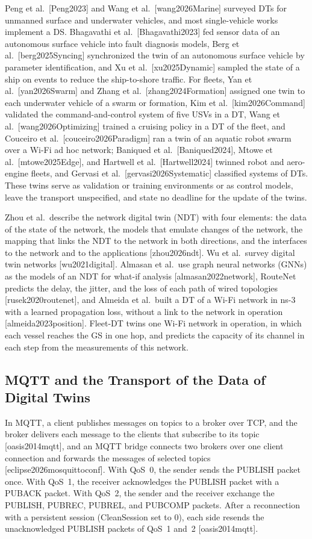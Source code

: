 Peng et al.\ [Peng2023] and Wang et al.\ [wang2026Marine] surveyed DTs for unmanned surface and underwater vehicles, and most single-vehicle works implement a DS. Bhagavathi et al.\ [Bhagavathi2023] fed sensor data of an autonomous surface vehicle into fault diagnosis models, Berg et al.\ [berg2025Syncing] synchronized the twin of an autonomous surface vehicle by parameter identification, and Xu et al.\ [xu2025Dynamic] sampled the state of a ship on events to reduce the ship-to-shore traffic. For fleets, Yan et al.\ [yan2026Swarm] and Zhang et al.\ [zhang2024Formation] assigned one twin to each underwater vehicle of a swarm or formation, Kim et al.\ [kim2026Command] validated the command-and-control system of five USVs in a DT, Wang et al.\ [wang2026Optimizing] trained a cruising policy in a DT of the fleet, and Couceiro et al.\ [couceiro2026Paradigm] ran a twin of an aquatic robot swarm over a Wi-Fi ad hoc network; Baniqued et al.\ [Baniqued2024], Mtowe et al.\ [mtowe2025Edge], and Hartwell et al.\ [Hartwell2024] twinned robot and aero-engine fleets, and Gervasi et al.\ [gervasi2026Systematic] classified systems of DTs. These twins serve as validation or training environments or as control models, leave the transport unspecified, and state no deadline for the update of the twins.

Zhou et al.\ describe the network digital twin (NDT) with four elements: the data of the state of the network, the models that emulate changes of the network, the mapping that links the NDT to the network in both directions, and the interfaces to the network and to the applications [zhou2026ndt]. Wu et al.\ survey digital twin networks [wu2021digital]. Almasan et al.\ use graph neural networks (GNNs) as the models of an NDT for what-if analysis [almasan2022network], RouteNet predicts the delay, the jitter, and the loss of each path of wired topologies [rusek2020routenet], and Almeida et al.\ built a DT of a Wi-Fi network in ns-3 with a learned propagation loss, without a link to the network in operation [almeida2023position]. Fleet-DT twins one Wi-Fi network in operation, in which each vessel reaches the GS in one hop, and predicts the capacity of its channel in each step from the measurements of this network.

\subsection{MQTT and the Transport of the Data of Digital Twins}\label{subsec:bg_mqtt}
In MQTT, a client publishes messages on topics to a broker over TCP, and the broker delivers each message to the clients that subscribe to its topic [oasis2014mqtt], and an MQTT bridge connects two brokers over one client connection and forwards the messages of selected topics [eclipse2026mosquittoconf]. With QoS~0, the sender sends the PUBLISH packet once. With QoS~1, the receiver acknowledges the PUBLISH packet with a PUBACK packet. With QoS~2, the sender and the receiver exchange the PUBLISH, PUBREC, PUBREL, and PUBCOMP packets. After a reconnection with a persistent session (CleanSession set to 0), each side resends the unacknowledged PUBLISH packets of QoS~1 and~2 [oasis2014mqtt].

